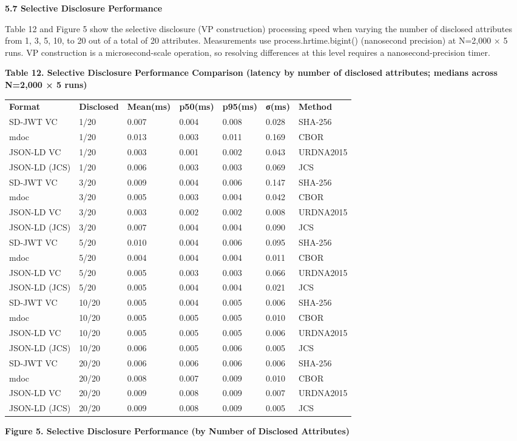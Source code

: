 \textbf{5.7 Selective Disclosure Performance}

Table 12 and Figure 5 show the selective disclosure (VP construction) processing speed when varying the number of disclosed attributes from 1, 3, 5, 10, to 20 out of a total of 20 attributes. Measurements use process.hrtime.bigint() (nanosecond precision) at N=2,000 × 5 runs. VP construction is a microsecond-scale operation, so resolving differences at this level requires a nanosecond-precision timer.

\textbf{Table 12. Selective Disclosure Performance Comparison (latency by number of disclosed attributes; medians across N=2,000 × 5 runs)}

\begin{longtable}[]{@{}lllllll@{}}
\toprule
\endhead
\textbf{Format} & \textbf{Disclosed} & \textbf{Mean(ms)} & \textbf{p50(ms)} & \textbf{p95(ms)} & \textbf{σ(ms)} & \textbf{Method}\tabularnewline
SD-JWT VC & 1/20 & 0.007 & 0.004 & 0.008 & 0.028 & SHA-256\tabularnewline
mdoc & 1/20 & 0.013 & 0.003 & 0.011 & 0.169 & CBOR\tabularnewline
JSON-LD VC & 1/20 & 0.003 & 0.001 & 0.002 & 0.043 & URDNA2015\tabularnewline
JSON-LD (JCS) & 1/20 & 0.006 & 0.003 & 0.003 & 0.069 & JCS\tabularnewline
SD-JWT VC & 3/20 & 0.009 & 0.004 & 0.006 & 0.147 & SHA-256\tabularnewline
mdoc & 3/20 & 0.005 & 0.003 & 0.004 & 0.042 & CBOR\tabularnewline
JSON-LD VC & 3/20 & 0.003 & 0.002 & 0.002 & 0.008 & URDNA2015\tabularnewline
JSON-LD (JCS) & 3/20 & 0.007 & 0.004 & 0.004 & 0.090 & JCS\tabularnewline
SD-JWT VC & 5/20 & 0.010 & 0.004 & 0.006 & 0.095 & SHA-256\tabularnewline
mdoc & 5/20 & 0.004 & 0.004 & 0.004 & 0.011 & CBOR\tabularnewline
JSON-LD VC & 5/20 & 0.005 & 0.003 & 0.003 & 0.066 & URDNA2015\tabularnewline
JSON-LD (JCS) & 5/20 & 0.005 & 0.004 & 0.004 & 0.021 & JCS\tabularnewline
SD-JWT VC & 10/20 & 0.005 & 0.004 & 0.005 & 0.006 & SHA-256\tabularnewline
mdoc & 10/20 & 0.005 & 0.005 & 0.005 & 0.010 & CBOR\tabularnewline
JSON-LD VC & 10/20 & 0.005 & 0.005 & 0.005 & 0.006 & URDNA2015\tabularnewline
JSON-LD (JCS) & 10/20 & 0.006 & 0.005 & 0.006 & 0.005 & JCS\tabularnewline
SD-JWT VC & 20/20 & 0.006 & 0.006 & 0.006 & 0.006 & SHA-256\tabularnewline
mdoc & 20/20 & 0.008 & 0.007 & 0.009 & 0.010 & CBOR\tabularnewline
JSON-LD VC & 20/20 & 0.009 & 0.008 & 0.009 & 0.007 & URDNA2015\tabularnewline
JSON-LD (JCS) & 20/20 & 0.009 & 0.008 & 0.009 & 0.005 & JCS\tabularnewline
\bottomrule
\end{longtable}

\textbf{Figure 5. Selective Disclosure Performance (by Number of Disclosed Attributes)}

